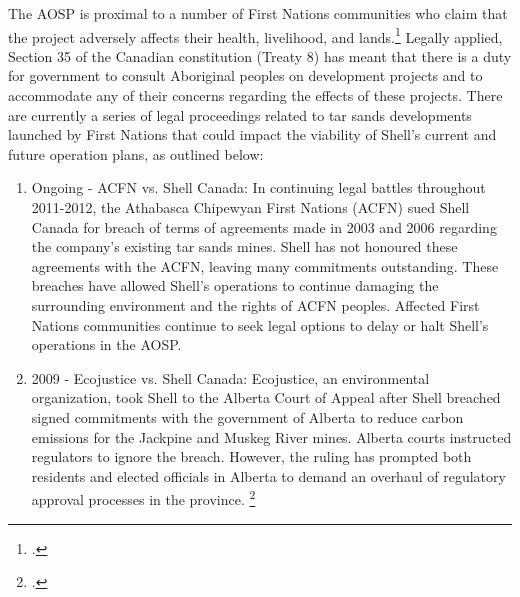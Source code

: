 The AOSP is proximal to a number of First Nations communities who claim that the project adversely affects their health, livelihood, and lands.\footcite[][]{RiskingRuin_2012}  
Legally applied, Section 35 of the Canadian constitution (Treaty 8) has meant that there is a duty for government to consult Aboriginal peoples on development projects and to accommodate any of their concerns regarding the effects of these projects. There are currently a series of legal proceedings related to tar sands developments launched by First Nations that could impact the viability of Shell's current and future operation plans, as outlined below:
\begin{enumerate}
	\item Ongoing - ACFN vs. Shell Canada: In continuing legal battles throughout 2011-2012, the Athabasca Chipewyan First Nations (ACFN) sued Shell Canada for breach of terms of agreements made in 2003 and 2006 regarding the company's existing tar sands mines. Shell has not honoured these agreements with the ACFN, leaving many commitments outstanding. These breaches have allowed Shell's operations to continue damaging the surrounding environment and the rights of ACFN peoples. Affected First Nations communities continue to seek legal options to delay or halt Shell's operations in the AOSP.
	\item 2009 - Ecojustice vs. Shell Canada: Ecojustice, an environmental organization, took Shell to the Alberta Court of Appeal after Shell breached signed commitments with the government of Alberta to reduce carbon emissions for the Jackpine and Muskeg River mines. Alberta courts instructed regulators to ignore the breach. However, the ruling has prompted both residents and elected officials in Alberta to demand an overhaul of regulatory approval processes in the province. \footcite[][]{RiskingRuin_2012}

\end{enumerate}

